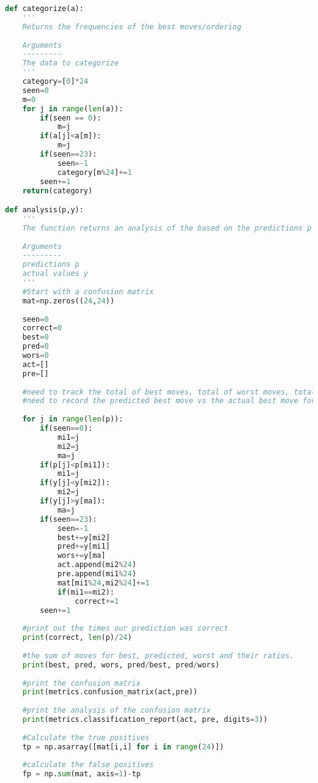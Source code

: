 \begin{lstlisting}[language=Python, caption=The code to train a DQN for the complex query, label={lst:DQN}]
def categorize(a):
    '''
    Returns the frequencies of the best moves/ordering
    
    Arguments
    ---------
    The data to categorize
    '''
    category=[0]*24
    seen=0
    m=0
    for j in range(len(a)):
        if(seen == 0):
            m=j
        if(a[j]<a[m]):
            m=j
        if(seen==23):
            seen=-1
            category[m%24]+=1
        seen+=1
    return(category)

def analysis(p,y):
    '''
    The function returns an analysis of the based on the predictions p and the actual values y
    
    Arguments
    ---------
    predictions p
    actual values y
    '''
    #Start with a confusion matrix
    mat=np.zeros((24,24))
    
    seen=0
    correct=0
    best=0
    pred=0
    wors=0
    act=[]
    pre=[]
    
    #need to track the total of best moves, total of worst moves, total of predicted moves
    #need to record the predicted best move vs the actual best move for confusion matrix
    
    for j in range(len(p)):
        if(seen==0):
            mi1=j
            mi2=j
            ma=j
        if(p[j]<p[mi1]):
            mi1=j
        if(y[j]<y[mi2]):
            mi2=j
        if(y[j]>y[ma]):
            ma=j
        if(seen==23):
            seen=-1
            best+=y[mi2]
            pred+=y[mi1]
            wors+=y[ma]
            act.append(mi2%24)
            pre.append(mi1%24)
            mat[mi1%24,mi2%24]+=1
            if(mi1==mi2):
                correct+=1
        seen+=1
    
    #print out the times our prediction was correct
    print(correct, len(p)/24)
    
    #the sum of moves for best, predicted, worst and their ratios.
    print(best, pred, wors, pred/best, pred/wors)
    
    #print the confusion matrix
    print(metrics.confusion_matrix(act,pre))
    
    #print the analysis of the confusion matrix
    print(metrics.classification_report(act, pre, digits=3))
    
    #Calculate the true positives
    tp = np.asarray([mat[i,i] for i in range(24)])
    
    #calculate the false positives
    fp = np.sum(mat, axis=1)-tp
    

\end{lstlisting}
